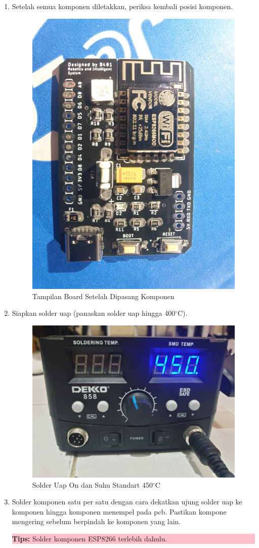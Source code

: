 \begin{enumerate}
    \item Setelah semua komponen diletakkan, periksa kembali posisi komponen.
    \begin{figure}[H]
        \centering
        \includegraphics[width=0.4\linewidth]{P4/img/5_tampilan_board_ketika_sudah_dipasang_komponen.jpeg}
        \caption{Tampilan Board Setelah Dipasang Komponen}
        \label{fig:KeadaanBoardSetelahDipasangKomponen}
    \end{figure}
    \item Siapkan solder uap (panaskan solder uap hingga 400$^{\circ}$C).
    \begin{figure}[H]
        \centering
        \includegraphics[width=0.4\linewidth]{P4/img/6_pastikan_switch_solder_uap_on_dan_suhu_standart_450.jpeg}
        \caption{Solder Uap On dan Suhu Standart 450$^{\circ}$C}
        \label{fig:SolderUapOn}
    \end{figure}
    \item Solder komponen satu per satu dengan cara dekatkan ujung solder uap ke komponen hingga komponen menempel pada pcb. Pastikan kompone mengering sebelum berpindah ke komponen yang lain.
    \begin{center}
        \colorbox{pink}{\parbox{0.8\linewidth}{\textbf{Tips:} Solder komponen ESP8266 terlebih dahulu.}}
    \end{center}
    \begin{figure}[H]
        \centering

\end{figure}
\end{enumerate}
